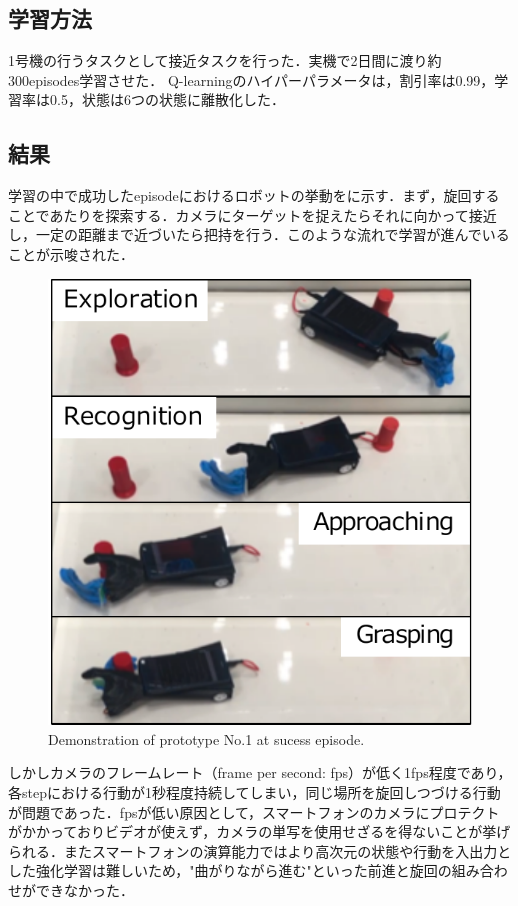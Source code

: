 \subsection{学習方法}
1号機の行うタスクとして接近タスクを行った．実機で2日間に渡り約300episodes学習させた．
Q-learningのハイパーパラメータは，割引率は0.99，学習率は0.5，状態は6つの状態に離散化した．


\subsection{結果}
学習の中で成功したepisodeにおけるロボットの挙動をに示す．まず，旋回することであたりを探索する．カメラにターゲットを捉えたらそれに向かって接近し，一定の距離まで近づいたら把持を行う．このような流れで学習が進んでいることが示唆された．

\begin{figure}[H]
    \centering
    \includegraphics[width=0.7\linewidth]{figure/chapter3/robothand-v1_demo}
    \caption{Demonstration of prototype No.1 at sucess episode.}
    \label{fig:1号機例}
\end{figure}

しかしカメラのフレームレート（frame per second: fps）が低く1fps程度であり，各stepにおける行動が1秒程度持続してしまい，同じ場所を旋回しつづける行動が問題であった．fpsが低い原因として，スマートフォンのカメラにプロテクトがかかっておりビデオが使えず，カメラの単写を使用せざるを得ないことが挙げられる．またスマートフォンの演算能力ではより高次元の状態や行動を入出力とした強化学習は難しいため，"曲がりながら進む"といった前進と旋回の組み合わせができなかった．


